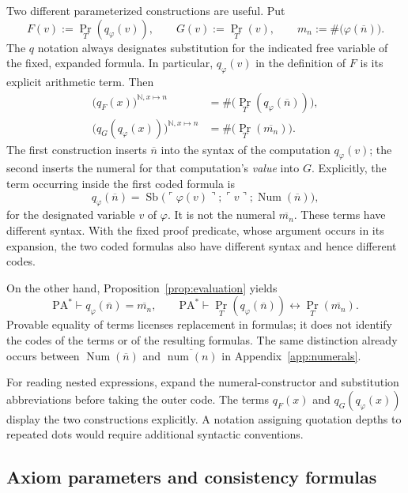 \documentclass[11pt]{article}
\newcommand{\N}{\mathbb N}
\newcommand{\PA}{\mathrm{PA}^{*}}
\newcommand{\num}{\operatorname{num}}
\newcommand{\Num}{\operatorname{Num}}
\newcommand{\Sb}{\operatorname{Sb}}
\newcommand{\Prov}{\operatorname{Pr}}
\newcommand{\code}[1]{\#\bigl(#1\bigr)}
\newcommand{\quo}[1]{\ulcorner #1\urcorner}
\newcommand{\bn}[1]{\overline{#1}}
\newcommand{\defeq}{\mathrel{:=}}
\theoremstyle{definition}
\begin{document}
Two different parameterized constructions are useful. Put
\[
 F(v)\defeq\Prov_T(q_\varphi(v)),\qquad
 G(v)\defeq\Prov_T(v),\qquad m_n\defeq\code{\varphi(\bn n)}.
\]
The $q$ notation always designates substitution for the indicated free
variable of the fixed, expanded formula. In particular,
$q_\varphi(v)$ in the definition of $F$ is its explicit arithmetic term.
Then
\begin{align}
 \bigl(q_F(x)\bigr)^{\N,x\mapsto n}
     &=\code{\Prov_T(q_\varphi(\bn n))},
       \label{eq:nest-one}\\
 \bigl(q_G(q_\varphi(x))\bigr)^{\N,x\mapsto n}
     &=\code{\Prov_T(\bn{m_n})}.
       \label{eq:nest-two}
\end{align}
The first construction inserts
$\bn n$ into the syntax of the computation $q_\varphi(v)$; the
second inserts the numeral for that computation's \emph{value} into $G$.
Explicitly, the term occurring inside the first coded formula is
\[
 q_\varphi(\bn n)
   =\Sb\bigl(\quo{\varphi(v)};\quo v;\Num(\bn n)\bigr),
\]
for the designated variable $v$ of $\varphi$. It is not the numeral
$\bn{m_n}$. These terms have different syntax. With the fixed proof
predicate, whose argument occurs in its expansion, the two coded
formulas also have different syntax and hence different codes.

On the other hand, Proposition~\ref{prop:evaluation} yields
\[
 \PA\vdash q_\varphi(\bn n)=\bn{m_n},
 \qquad
 \PA\vdash
 \Prov_T(q_\varphi(\bn n))\leftrightarrow\Prov_T(\bn{m_n}).
\]
Provable equality of terms licenses replacement in formulas; it does
not identify the codes of the terms or of the resulting formulas.
The same distinction already occurs between $\Num(\bn n)$ and
$\bn{\num(n)}$ in Appendix~\ref{app:numerals}.

For reading nested expressions, expand the numeral-constructor and
substitution abbreviations before taking the outer code. The terms
$q_F(x)$ and $q_G(q_\varphi(x))$ display the two constructions explicitly.
A notation assigning quotation depths to repeated dots would require
additional syntactic conventions.

\subsection{Axiom parameters and consistency formulas}
\end{document}

